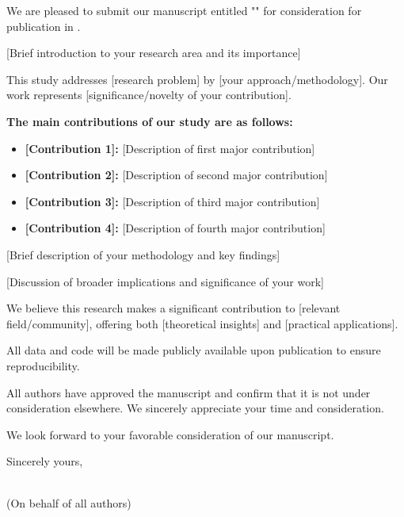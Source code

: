 \documentclass{article}
\begin{document}
We are pleased to submit our manuscript entitled "\myTitle" for consideration for publication in \journalName.

[Brief introduction to your research area and its importance]

This study addresses [research problem] by [your approach/methodology]. Our work represents [significance/novelty of your contribution].

\bigskip

\textbf{The main contributions of our study are as follows:}
\begin{itemize}
    \item \textbf{[Contribution 1]:} [Description of first major contribution]
    
    \item \textbf{[Contribution 2]:} [Description of second major contribution]
    
    \item \textbf{[Contribution 3]:} [Description of third major contribution]
    
    \item \textbf{[Contribution 4]:} [Description of fourth major contribution]
    
\end{itemize}

\bigskip

[Brief description of your methodology and key findings]

[Discussion of broader implications and significance of your work]

We believe this research makes a significant contribution to [relevant field/community], offering both [theoretical insights] and [practical applications].


All data and code will be made publicly available upon publication to ensure reproducibility.

All authors have approved the manuscript and confirm that it is not under consideration elsewhere. We sincerely appreciate your time and consideration.

We look forward to your favorable consideration of our manuscript.

\bigskip %

Sincerely yours,

\vspace{20pt} %

\correspondingAuthorName \\
(On behalf of all authors)
\end{document}
